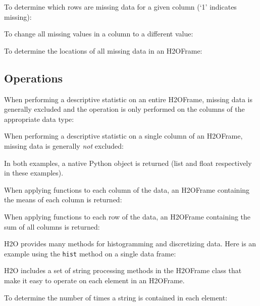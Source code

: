 {To determine which rows are missing data for a given column (`1' indicates missing):


To change all missing values in a column to a different value:


\newpage
To determine the locations of all missing data in an H2OFrame:


\subsection{Operations}
When performing a descriptive statistic on an entire H2OFrame, missing data is generally excluded
and the operation is only performed on the columns of the appropriate data type:


When performing a descriptive statistic on a single column of an H2OFrame, missing data is generally 
\textit{not} excluded:


In both examples,  a native Python object is returned (list and float respectively
in these examples).

When applying functions to each column of the data, an H2OFrame containing the means of each column is returned:


When applying functions to each row of the data, an H2OFrame containing the sum of all columns is returned:


H2O provides many methods for histogramming and discretizing data.
Here is an example using the {\texttt{hist}} method on a single data frame:


H2O includes a set of string processing methods in the H2OFrame class
that make it easy to operate on each element in an H2OFrame.  

To determine the number of times a string is contained in each element:


}
